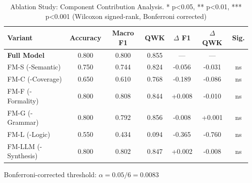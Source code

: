 \begin{table}[h]
\centering
\caption{Ablation Study: Component Contribution Analysis. * p<0.05, ** p<0.01, *** p<0.001 (Wilcoxon signed-rank, Bonferroni corrected)}
\label{tab:ablation}
\begin{tabular}{lcccccc}
\hline
Variant & Accuracy & Macro F1 & QWK & $\Delta$ F1 & $\Delta$ QWK & Sig. \\ \hline
\textbf{Full Model} & 0.800 & 0.800 & 0.855 & — & — &  \\
FM-S (-Semantic) & 0.750 & 0.744 & 0.824 & -0.056 & -0.031 & ns \\
FM-C (-Coverage) & 0.650 & 0.610 & 0.768 & -0.189 & -0.086 & ns \\
FM-F (-Formality) & 0.800 & 0.808 & 0.844 & +0.008 & -0.010 & ns \\
FM-G (-Grammar) & 0.800 & 0.792 & 0.856 & -0.008 & +0.001 & ns \\
FM-L (-Logic) & 0.550 & 0.434 & 0.094 & -0.365 & -0.760 & ns \\
FM-LLM (-Synthesis) & 0.800 & 0.802 & 0.847 & +0.002 & -0.008 & ns \\
\hline
\end{tabular}
\begin{tablenotes}
\item[*] Bonferroni-corrected threshold: $\alpha = 0.05 / 6 = 0.0083$
\end{tablenotes}
\end{table}